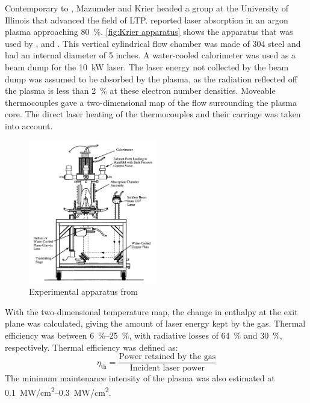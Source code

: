         Contemporary to \textcite{keeferPowerAbsorptionLasersustained1986a}, Mazumder and Krier headed a group at the University of Illinois that advanced the field of LTP. \textcite{krierContinuousWaveLaser1986a} reported laser absorption in an argon plasma approaching \qty{80}{\%}. \autoref{fig:Krier apparatus} shows the apparatus that was used by \textcite{krierContinuousWaveLaser1986a}, \textcite{zerkleLasersustainedArgonPlasmas1990} and \textcite{chenEmissionSpectroscopyCw1989a}. This vertical cylindrical flow chamber was made of 304 steel and had an internal diameter of 5 inches. A water-cooled calorimeter was used as a beam dump for the \qty{10}{kW}  laser. The laser energy not collected by the beam dump was assumed to be absorbed by the plasma, as the radiation reflected off the plasma is less than \qty{2}{\%} at these electron number densities. Moveable thermocouples gave a two-dimensional map of the flow surrounding the plasma core. The direct laser heating of the thermocouples and their carriage was taken into account.
        \begin{figure}[!ht]
            \centering
            \includegraphics[width=0.5\textwidth]{assets/2 background/Illinois (Krier) Apparatus.png}
            \caption{Experimental apparatus from \textcite{zerkleLasersustainedArgonPlasmas1990}}
            \label{fig:Krier apparatus}
        \end{figure}
        With the two-dimensional temperature map, the change in enthalpy at the exit plane was calculated, giving the amount of laser energy kept by the gas. Thermal efficiency was between \qtyrange{6}{25}{\%}, with radiative losses of \qty{64}{\%} and \qty{30}{\%}, respectively. Thermal efficiency was defined as:
        \[\eta_\mathrm{th} =  \frac{\text{Power retained by the gas}}{\text{Incident laser power}}\]
        The minimum maintenance intensity of the plasma was also estimated at \qtyrange{0.1}{0.3}{MW/cm^2}.


